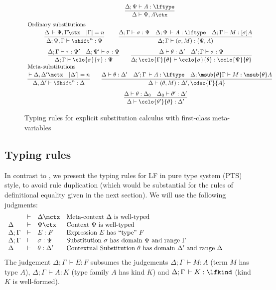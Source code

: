 \documentclass[copyright,creativecommons]{eptcs}
\newcommand{\der}{\,\vdash}
\newcommand{\cxt}{\ctx}  \newcommand{\mcxt}{\mctx}
\begin{document}
\begin{figure}[htbp]
\[\begin{array}{c}
\infer{\Delta \vdash \Psi, A \ctx}{
\Delta; \Psi \vdash A : \lftype
}
\\[0.5em]
\multicolumn{1}{l}{\mbox{Ordinary substitutions}} \\[0.25em]
 \infer[]
       {\Delta; \Psi, \Gamma \vdash \shift^n : \Psi}
       {\Delta \der \Psi,\Gamma \cxt & |\Gamma| = n }
\qquad
 \infer[]
       {\Delta; \Gamma \vdash (\sigma, M) : (\Psi, A)}
       {\Delta; \Gamma \vdash \sigma : \Psi &
        \Delta; \Psi \der A : \lftype &
        \Delta; \Gamma \vdash M : [\sigma]A}
\\[0.75em]
\infer{\Delta; \Gamma \vdash \clo{\sigma}{\tau} : \Psi}
  {\Delta; \Gamma \vdash \tau : \Psi' & 
   \Delta; \Psi' \vdash \sigma : \Psi }
\qquad
\infer{\Delta; \cclo{\Gamma}{\theta} \vdash \cclo{\sigma}{\theta} :  \cclo{\Psi}{\theta}}
{\Delta \vdash \theta : \Delta' & 
  \Delta' ; \Gamma \vdash \sigma : \Psi  
}
\\\multicolumn{1}{l}{\mbox{Meta-substitutions}} \\[0.25em]
\infer{\Delta, \Delta' \vdash \Shift^n : \Delta}{\der \Delta,\Delta' \mcxt
  & |\Delta'| = n }
\quad\quad
\infer{\Delta \vdash (\theta, M) : \Delta' , \cdec{\Gamma}{A}}
{\Delta \vdash \theta : \Delta' &
  \Delta'; \Gamma \der A : \lftype &
  \Delta; \msub{\theta}\Gamma \vdash M : \msub{\theta}A
}  
\\[0.75em]
\qquad
\infer{\Delta \vdash \cclo{\theta'}{\theta} : \Delta'}{
\Delta   \vdash \theta  : \Delta_0 &
\Delta_0 \vdash \theta' : \Delta' 
}
\end{array}
\]     
 \caption{Typing rules for explicit substitution calculus with first-class meta-variables}
 \label{fig:tprules}
\end{figure}

 

\subsection{Typing rules }

In contrast to \cite{harperPfenning:equivalenceLF},
we present the typing rules for LF in pure type system (PTS) style, to
avoid rule duplication (which would be substantial for the rules of
definitional equality given in the next section). We will use the
following judgments: 
\[
\begin{array}{lclp{10cm}}
                & \vdash & \Delta \mctx & Meta-context $\Delta$ is well-typed \\
\Delta          & \vdash & \Psi \ctx    & Context $\Psi$ is well-typed
\\
\Delta; \Gamma & \vdash & E : F      & Expression $E$ has ``type'' $F$\\
\Delta; \Gamma & \vdash & \sigma : \Psi & Substitution $\sigma$ has
domain $\Psi$ and range $\Gamma$\\
\Delta  & \vdash & \theta : \Delta' & Contextual Substitution $\theta$ has
domain $\Delta'$ and range $\Delta$
\end{array}
\]
The judgement $\Delta; \Gamma \der E : F$ subsumes the judgements
$\Delta; \Gamma \der M : A$ (term $M$ has type $A$), 
$\Delta; \Gamma \der A : K$ (type family $A$ has kind $K$) and
$\Delta; \Gamma \der K : \lfkind$ (kind $K$ is well-formed).
\end{document}

